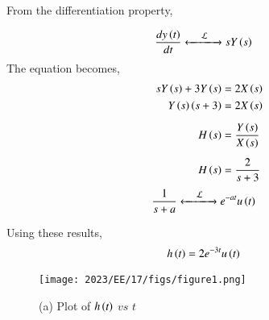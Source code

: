 \documentclass[journal,12pt,onecolumn]{IEEEtran}
\theoremstyle{remark}
\begin{document}
	
	
	From the differentiation property,
	
	\begin{align}
		\dfrac{dy\left(t\right)}{dt} &
		\xleftarrow[]{\hspace{0.4cm}{\mathcal{L}}\hspace{0.1cm}}\xrightarrow[]{}
		s Y\left(s\right)
	\end{align}
	The equation becomes,
	\begin{align}
		s Y\left(s\right) + 3 Y\left(s\right) &= 2 X\left(s\right)\\
		Y\left(s\right) \left(s + 3\right) &= 2 X\left(s\right)\\[5pt]
		H\left(s\right) &= \dfrac{Y\left(s\right)}{X\left(s\right)}\\[5pt]
		H\left(s\right) &= \dfrac{2}{s + 3}
	\end{align}
	\begin{align}
		\dfrac{1}{s + a} &
		\xleftarrow[]{\hspace{0.4cm}{\mathcal{L}}\hspace{0.1cm}}\xrightarrow[]{}
		e^{-at} u\left(t\right)
	\end{align}
	
	Using these results,
	\begin{align}
		h\left(t\right) &= 2 e^{-3t} u\left(t\right) 
	\end{align}
	
	
	
	\begin{figure}[htbp]
		\centering
		\texttt{[image: 2023/EE/17/figs/figure1.png]}
		\caption{(a) Plot of $h\left(t\right)$ $vs$ $t$}
	\end{figure}
	
\end{document}

